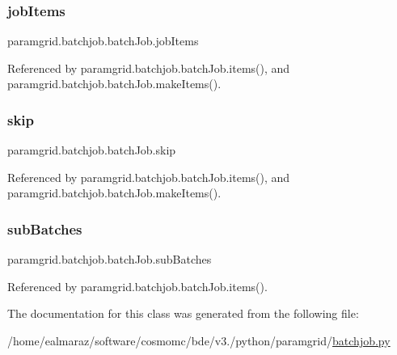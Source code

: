 \mbox{\label{classparamgrid_1_1batchjob_1_1batchJob_a69b788da22154b4c3422d5a1d66c35eb}} 
\subsubsection{\texorpdfstring{job\+Items}{jobItems}}
{\footnotesize\ttfamily paramgrid.\+batchjob.\+batch\+Job.\+job\+Items}



Referenced by paramgrid.\+batchjob.\+batch\+Job.\+items(), and paramgrid.\+batchjob.\+batch\+Job.\+make\+Items().

\mbox{\label{classparamgrid_1_1batchjob_1_1batchJob_abb20adbebddd78e96923567994800b09}} 
\subsubsection{\texorpdfstring{skip}{skip}}
{\footnotesize\ttfamily paramgrid.\+batchjob.\+batch\+Job.\+skip}



Referenced by paramgrid.\+batchjob.\+batch\+Job.\+items(), and paramgrid.\+batchjob.\+batch\+Job.\+make\+Items().

\mbox{\label{classparamgrid_1_1batchjob_1_1batchJob_a39f0c10b486041bb9ccf5f2a20027e12}} 
\subsubsection{\texorpdfstring{sub\+Batches}{subBatches}}
{\footnotesize\ttfamily paramgrid.\+batchjob.\+batch\+Job.\+sub\+Batches}



Referenced by paramgrid.\+batchjob.\+batch\+Job.\+items().



The documentation for this class was generated from the following file\+:\begin{DoxyCompactItemize}
\item 
/home/ealmaraz/software/cosmomc/bde/v3./python/paramgrid/\mbox{\hyperlink{batchjob_8py}{batchjob.\+py}}\end{DoxyCompactItemize}
